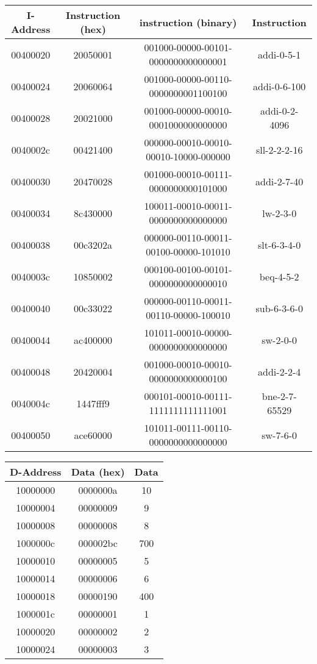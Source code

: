 \documentclass[11pt]{article}   	%
\begin{document}
\begin{table}[!htbp]

\begin{tabular}{|c|c|c|c|}
\hline
I-Address & Instruction (hex) & instruction (binary)  &  Instruction \\
\hline
00400020 & 20050001 & 001000-00000-00101-0000000000000001 & addi-0-5-1 \\
\hline
00400024 & 20060064 & 001000-00000-00110-0000000001100100 & addi-0-6-100  \\
\hline
00400028 & 20021000 & 001000-00000-00010-0001000000000000 & addi-0-2-4096\\
\hline
0040002c & 00421400 & 000000-00010-00010-00010-10000-000000 & sll-2-2-2-16  \\
\hline
00400030 & 20470028 & 001000-00010-00111-0000000000101000 & addi-2-7-40  \\
\hline
00400034 & 8c430000 & 100011-00010-00011-0000000000000000 &lw-2-3-0  \\
\hline
00400038 & 00c3202a & 000000-00110-00011-00100-00000-101010 &slt-6-3-4-0\\
\hline
0040003c & 10850002 & 000100-00100-00101-0000000000000010 & beq-4-5-2  \\
\hline
00400040 & 00c33022 & 000000-00110-00011-00110-00000-100010 &sub-6-3-6-0   \\
\hline
00400044 & ac400000 & 101011-00010-00000-0000000000000000 &sw-2-0-0 \\
\hline
00400048 & 20420004 & 001000-00010-00010-0000000000000100 & addi-2-2-4 \\
\hline
0040004c & 1447fff9 & 000101-00010-00111-1111111111111001 &bne-2-7-65529 \\
\hline
00400050 & ace60000& 101011-00111-00110-0000000000000000 &sw-7-6-0  \\
\hline
\end{tabular}
\end{table}

\begin{table}[!htbp]
\begin{tabular}{|c|c|c|}
\hline
D-Address & Data (hex) & Data \\
\hline
10000000 & 0000000a & 10 \\
\hline
10000004 & 00000009 & 9 \\
\hline
10000008 & 00000008 & 8 \\
\hline
1000000c & 000002bc & 700  \\
\hline
10000010 & 00000005 & 5 \\
\hline
10000014 & 00000006 & 6 \\
\hline
10000018 & 00000190 & 400 \\
\hline
1000001c & 00000001 & 1 \\
\hline
10000020 & 00000002 & 2 \\
\hline
10000024 & 00000003 & 3 \\
\hline


\end{tabular}
\end{table}
\end{document}
